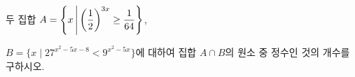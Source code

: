 두 집합 $A=\left\{x\mkern3mu \middle|\mkern3mu \left(\dfrac{1}{2}\right)^{3x}\ge\dfrac{1}{64}\right\}$,\par\noindent $B=\{x\mid 27^{x^2-5x-8}<9^{x^2-5x}\}$에 대하여 집합 $A\cap B$의 원소 중 정수인 것의 개수를 구하시오.
